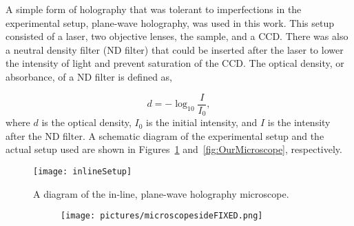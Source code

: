 A simple form of holography that was tolerant to imperfections in the
experimental setup, plane-wave holography, was used in this work. This
setup consisted of a laser, two objective lenses, the sample, and a CCD\@. There was
also a neutral density filter (ND filter) that could be inserted after the
laser to lower the
intensity of light and
prevent saturation of the CCD\@.
The optical density, or absorbance, of a ND filter is defined as,

\begin{equation}
    d = -\log_{10}\frac{I}{I_0},
    \label{eq:ND}
\end{equation}
where $d$ is the optical density, $I_0$ is the initial intensity, and $I$ is
the intensity after the ND filter.
A schematic diagram of
the experimental setup and the actual setup used are shown in Figures~\ref{fig:inlineSetup}
and~\ref{fig:OurMicroscope}, respectively.



\begin{figure}[htbp!]
    \begin{center}
        \texttt{[image: inlineSetup]}
    \end{center}
    \caption{A diagram of the in-line, plane-wave holography microscope.}
    \label{fig:inlineSetup}
\end{figure}


\begin{figure}[ht!]
    \begin{center}
        \begin{subfigure}[t]{\textwidth}
            \label{fig:OurMicroscopeSide}
            \texttt{[image: pictures/microscopesideFIXED.png]}
            \caption{}
        \end{subfigure}
%

    \end{center}
\end{figure}

